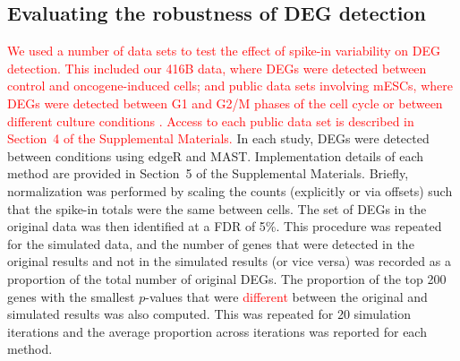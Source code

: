 \documentclass{article}
\newcommand{\suppsecdata}{4}
\newcommand{\suppsecsim}{5}
\newcommand{\revised}[1]{\textcolor{red}{#1}}
\begin{document}

\subsection*{Evaluating the robustness of DEG detection}
\revised{We used a number of data sets to test the effect of spike-in variability on DEG detection.
This included our 416B data, where DEGs were detected between control and oncogene-induced cells;
and public data sets involving mESCs, where DEGs were detected between G1 and G2/M phases of the cell cycle \autocite{buettner2015computational}
or between different culture conditions \autocite{grun2014validation,kolod2015single}.
Access to each public data set is described in Section~\suppsecdata{} of the Supplemental Materials.}
In each study, DEGs were detected between conditions using edgeR and MAST.
Implementation details of each method are provided in Section~\suppsecsim{} of the Supplemental Materials. 
Briefly, normalization was performed by scaling the counts (explicitly or via offsets) such that the spike-in totals were the same between cells.
The set of DEGs in the original data was then identified at a FDR of 5\%.
This procedure was repeated for the simulated data, and the number of genes that were detected in the original results and not in the simulated results (or vice versa) was recorded as a proportion of the total number of original DEGs.
The proportion of the top 200 genes with the smallest $p$-values that were \revised{different} between the original and simulated results was also computed.
This was repeated for 20 simulation iterations and the average proportion across iterations was reported for each method.
\end{document}
